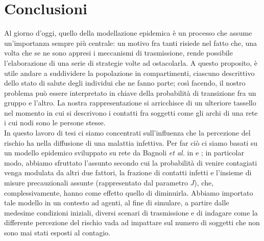 \chapter{Conclusioni}
\label{chap:conclusioni}
Al giorno d'oggi, quello della modellazione epidemica è un processo che assume un'importanza sempre più centrale: un motivo fra tanti risiede nel fatto che, una volta che se ne sono appresi i meccanismi di trasmissione, rende possibile l'elaborazione di una serie di strategie volte ad ostacolarla. A questo proposito, è utile andare a suddividere la popolazione in compartimenti, ciascuno descrittivo dello stato di salute degli individui che ne fanno parte; così facendo, il nostro problema può essere interpretato in chiave della probabilità di transizione fra un gruppo e l'altro. La nostra rappresentazione si arricchisce di un ulteriore tassello nel momento in cui si descrivono i contatti fra soggetti come gli archi di una rete i cui nodi sono le persone stesse. 
\medskip
\\
In questo lavoro di tesi ci siamo concentrati sull'influenza che la percezione del rischio ha nella diffusione di una malattia infettiva. Per far ciò ci siamo basati su un modello epidemico sviluppato su rete da Bagnoli \textit{et al.} in \cite{Bagnoli2014} e \cite{Bagnoli2007}; in particolar modo, abbiamo sfruttato l'assunto secondo cui la probabilità di venire contagiati venga modulata da altri due fattori, la frazione di contatti infetti e l'insieme di misure precauzionali assunte (rappresentato dal parametro $ J $), che, complessivamente, hanno come effetto quello di diminuirla. Abbiamo importato tale modello in un contesto ad agenti, al fine di simulare, a partire dalle medesime condizioni iniziali, diversi scenari di trasmissione e di indagare come la differente percezione del rischio vada ad impattare sul numero di soggetti che non sono mai stati esposti al contagio. 
